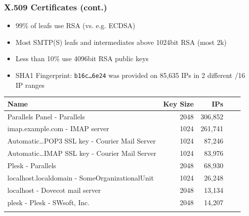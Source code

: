 \documentclass[14pt,aspectratio=43]{beamer}
\begin{document}
\begin{frame}
  \frametitle{X.509 Certificates (cont.)}
  \begin{center}
   \begin{itemize}
    \item 99\% of leafs use RSA (vs. e.g. ECDSA)
    \item Most SMTP(S) leafs and intermediates above 1024bit RSA (most 2k)
    \item Less than 10\% use 4096bit RSA public keys
    \item SHA1 Fingerprint: \texttt{b16c\ldots6e24} was provided on 85,635 IPs in 2 different /16 IP ranges
   \end{itemize}
\vspace{10px}
\tiny
\begin{table}[]
\centering
\begin{tabular}{lrrrr}
\hline
Name      & Key Size & IPs \\
\hline
Parallels Panel - Parallels                                & 2048        & 306,852  \\
imap.example.com - IMAP server                             & 1024        & 261,741  \\
Automatic{\ldots}POP3 SSL key - Courier Mail Server        & 1024        &  87,246   \\
Automatic{\ldots}IMAP SSL key - Courier Mail Server        & 1024        &  83,976   \\
Plesk - Parallels                                          & 2048        &  68,930   \\
localhost.localdomain - SomeOrganizationalUnit             & 1024        &  26,248   \\
localhost - Dovecot mail server                            & 2048        &  13,134   \\
plesk - Plesk - SWsoft, Inc.                               & 2048        &  14,207   \\
\hline \\      
\end{tabular}
\end{table}

  \end{center}
\end{frame}
\end{document}
